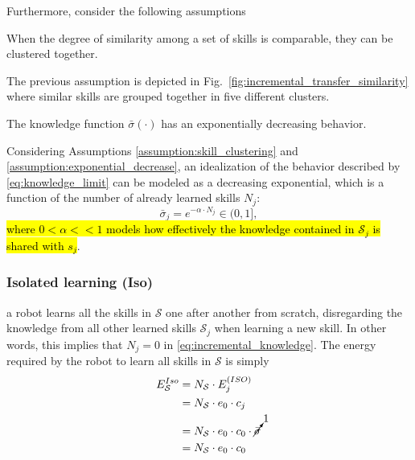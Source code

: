 Furthermore, consider the following assumptions
\begin{tcolorbox}
	\begin{assumption}\label{assumption:skill_clustering} When the degree of similarity among a set of skills is comparable, they can be clustered together.
	\end{assumption}
\end{tcolorbox}
The previous assumption is depicted in Fig.~\ref{fig:incremental_transfer_similarity} where similar skills are grouped together in five different clusters.
\begin{tcolorbox}
	\begin{assumption}\label{assumption:exponential_decrease} The knowledge function $\bar{\sigma}(\cdot)$ has an exponentially decreasing behavior.
	\end{assumption}
\end{tcolorbox} 
Considering Assumptions \ref{assumption:skill_clustering} and \ref{assumption:exponential_decrease}, an idealization of the behavior described by \eqref{eq:knowledge_limit} can be modeled as a decreasing exponential, which is a function of the number of already learned skills $N_j$:%
\begin{equation}\label{eq:incremental_knowledge}
  \bar{\sigma}_j = e^{-\alpha  \cdot N_{j}} \in (0,1],
\end{equation}
\hl{where $ 0<\alpha<<1$ models how effectively the knowledge contained in $\mathcal{S}_j$ is shared with $s_j$}.

\subsubsection{\textbf{Isolated learning (Iso)}} a robot learns all the skills in $\mathcal{S}$ one after another from scratch, disregarding the knowledge from all other learned skills $\mathcal{S}_j$ when learning a new skill. In other words, this implies that $N_j = 0$ in \eqref{eq:incremental_knowledge}. The energy required by the robot to learn all skills in $\mathcal{S}$ is simply
\begin{align}
    \begin{split}
      E^{Iso}_{\mathcal{S}} &= N_{\mathcal{S}} \cdot E^{(ISO)}_j\\ 
      &= N_{\mathcal{S}} \cdot e_{0} \cdot c_{j} \\
      &= N_{\mathcal{S}} \cdot e_{0} \cdot c_{0} \cdot \cancelto{1}{\bar{\sigma}}\\
      &= N_{\mathcal{S}} \cdot e_{0} \cdot c_{0}
    \end{split}
\end{align}

